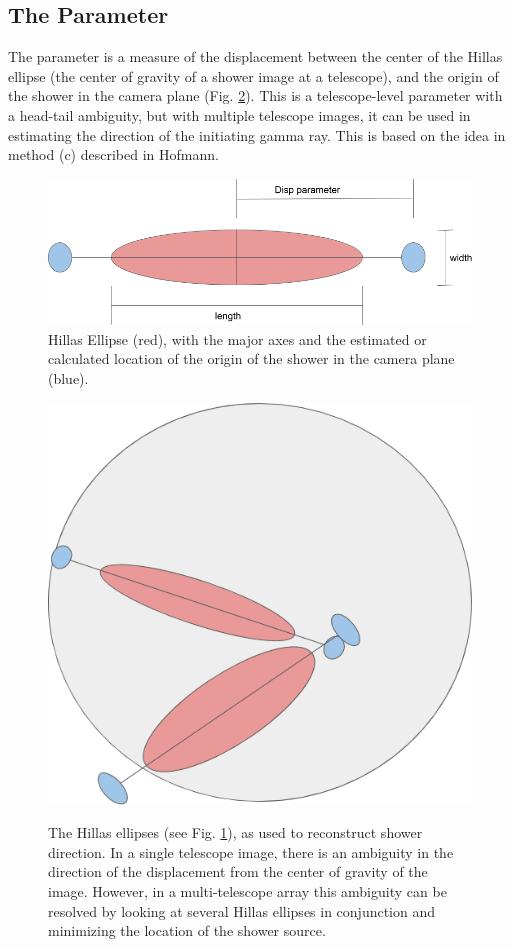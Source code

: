\documentclass[main.tex]{subfiles}
\begin{document}
\subsection{The \disp Parameter}
The \disp parameter is a measure of the displacement between the center of the Hillas ellipse (the center of gravity of a shower image at a telescope), and the origin of the shower in the camera plane (Fig. \ref{fig:Disp_FOV}). This is a telescope-level parameter with a head-tail ambiguity, but with multiple telescope images, it can be used in estimating the direction of the initiating gamma ray. This is based on the idea in method (c) described in Hofmann\cite{Hofmann:1999dx}.
\begin{figure}[htbp]
  \centering
  \includegraphics[width=.58\linewidth]{images/Disp_param}
  \caption[The Hillas ellipse]{Hillas Ellipse (red), with the major axes and the estimated or calculated location of the origin of the shower in the camera plane (blue).}
  \label{fig:hillas_ellipse}
\end{figure}

\begin{figure}[H]
  \begin{center}
      \includegraphics[width=0.48\linewidth]{images/Disp_FOV}
      \label{fig:Disp_FOV}
  \end{center}
  \caption[The Disp Parameter]{The Hillas ellipses (see Fig. \ref{fig:hillas_ellipse}), as used to reconstruct shower direction. In a single telescope image, there is an ambiguity in the direction of the displacement from the center of gravity of the image. However, in a multi-telescope array this ambiguity can be resolved by looking at several Hillas ellipses in conjunction and minimizing the location of the shower source.}
  \label{fig:Disp_FOV}
\end{figure}

\end{document}
